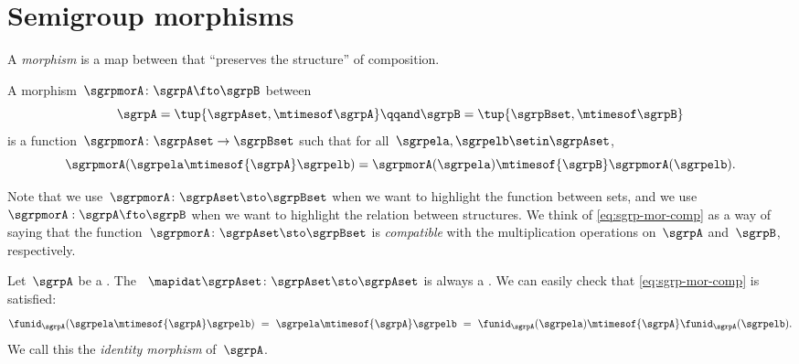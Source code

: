 

\section{Semigroup morphisms}
\label{sec:semigroup-morphisms}

A \emph{morphism} is a map between  that ``preserves the structure'' of composition.



\begin{ctdefinition}
    \label{def:semigroup-mor}
    A morphism~$\sgrpmorA\colon \sgrpA \fto \sgrpB$ between  \begin{equation}
        \label{eq:sgrpAB}
        \sgrpA = \tup{\sgrpAset, \mtimesof\sgrpA}
        \qqand
        \sgrpB = \tup{\sgrpBset, \mtimesof\sgrpB}
    \end{equation}
    is a function~$\sgrpmorA\colon \sgrpAset \to \sgrpBset$ such that for all~$\sgrpela, \sgrpelb \setin \sgrpAset$,
    \begin{equation}
        \label{eq:sgrp-mor-comp}
        \sgrpmorA(\sgrpela \mtimesof{\sgrpA} \sgrpelb) = \sgrpmorA (\sgrpela) \mtimesof{\sgrpB} \sgrpmorA(\sgrpelb).
    \end{equation}
\end{ctdefinition}

Note that we use~$\sgrpmorA\colon \sgrpAset \sto \sgrpBset$ when we want to highlight the function between sets, and we use~$\sgrpmorA: \sgrpA \fto \sgrpB$ when we want to highlight the relation between  structures.
We think of \cref{eq:sgrp-mor-comp} as a way of saying that the function~$\sgrpmorA\colon \sgrpAset \sto \sgrpBset$ is \emph{compatible} with the multiplication operations on~$\sgrpA$ and~$\sgrpB$, respectively.

\begin{ctdefinition}
    \label{def:identity-sgrp-mor}
    Let~$\sgrpA$ be a .
    The ~$\mapidat\sgrpAset\colon \sgrpAset \sto \sgrpAset$ is always a .
    We can easily check that \cref{eq:sgrp-mor-comp} is satisfied:
    \begin{equation}
        \label{eq:identity-sgrp-mor-proof}
        \funid_\sgrpA (\sgrpela \mtimesof{\sgrpA} \sgrpelb) \ = \ \sgrpela \mtimesof{\sgrpA} \sgrpelb
        \ = \
        \funid_\sgrpA (\sgrpela )\mtimesof{\sgrpA}\funid_\sgrpA(\sgrpelb).
    \end{equation}
    We call this the \emph{identity morphism} of~$\sgrpA$.
\end{ctdefinition}

